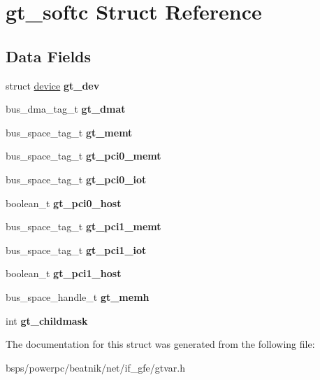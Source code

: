 \hypertarget{structgt__softc}{}\section{gt\+\_\+softc Struct Reference}
\label{structgt__softc}
\subsection*{Data Fields}
\begin{DoxyCompactItemize}
\item 
\mbox{\label{structgt__softc_a017794ab6924d85dad958c6b4fc54287}} 
struct \mbox{\hyperlink{structdevice}{device}} {\bfseries gt\+\_\+dev}
\item 
\mbox{\label{structgt__softc_a57c5380172b568c19e1af68378acb0a0}} 
bus\+\_\+dma\+\_\+tag\+\_\+t {\bfseries gt\+\_\+dmat}
\item 
\mbox{\label{structgt__softc_a1bec5e08bcd37faf5dbb7cd4082e7639}} 
bus\+\_\+space\+\_\+tag\+\_\+t {\bfseries gt\+\_\+memt}
\item 
\mbox{\label{structgt__softc_aca20fabacec6722583310455e8741845}} 
bus\+\_\+space\+\_\+tag\+\_\+t {\bfseries gt\+\_\+pci0\+\_\+memt}
\item 
\mbox{\label{structgt__softc_ab90f55515ca4d6eef738704f075a2643}} 
bus\+\_\+space\+\_\+tag\+\_\+t {\bfseries gt\+\_\+pci0\+\_\+iot}
\item 
\mbox{\label{structgt__softc_aa651c300db82b7cded8d34a313207a26}} 
boolean\+\_\+t {\bfseries gt\+\_\+pci0\+\_\+host}
\item 
\mbox{\label{structgt__softc_ad53562747a0e1086816ce7e4d0e39056}} 
bus\+\_\+space\+\_\+tag\+\_\+t {\bfseries gt\+\_\+pci1\+\_\+memt}
\item 
\mbox{\label{structgt__softc_af23046be983114dfe3ab1371fde23ba0}} 
bus\+\_\+space\+\_\+tag\+\_\+t {\bfseries gt\+\_\+pci1\+\_\+iot}
\item 
\mbox{\label{structgt__softc_af04a87b069351b24f7ff79da708ef330}} 
boolean\+\_\+t {\bfseries gt\+\_\+pci1\+\_\+host}
\item 
\mbox{\label{structgt__softc_a661b2da2e73afa4bcbd49fa0191cc756}} 
bus\+\_\+space\+\_\+handle\+\_\+t {\bfseries gt\+\_\+memh}
\item 
\mbox{\label{structgt__softc_ae764cc9b0cbda7412cdc2982077bab96}} 
int {\bfseries gt\+\_\+childmask}
\end{DoxyCompactItemize}


The documentation for this struct was generated from the following file\+:\begin{DoxyCompactItemize}
\item 
bsps/powerpc/beatnik/net/if\+\_\+gfe/gtvar.\+h\end{DoxyCompactItemize}

